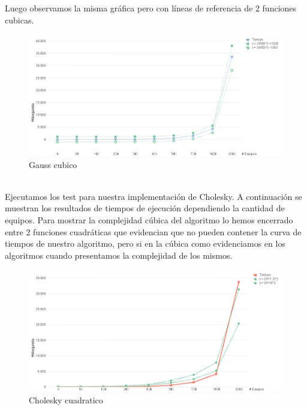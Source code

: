 Luego observamos la misma gráfica pero con líneas de referencia de 2 funciones cubicas. \\

\begin{figure}[H]
    \centering
    \includegraphics[width=1\textwidth]{IMG/gauss cubico.png}
    \caption{Gauss cubico}
    \label{fig:Gauss cubico}
\end{figure}

\\
Ejecutamos los test para nuestra implementación de Cholesky. A continuación se muestran los resultados de tiempos de ejecución dependiendo la cantidad de equipos.
Para mostrar la complejidad cúbica del algoritmo lo hemos encerrado entre 2 funciones cuadráticas que evidencian que no pueden contener la curva de tiempos de nuestro algoritmo, pero si en la cúbica como evidenciamos en los algoritmos cuando presentamos la complejidad de los mismos.\\

\begin{figure}[H]
    \centering
    \includegraphics[width=1\textwidth]{IMG/cholesky cuadratico.png}
    \caption{Cholesky cuadratico}
    \label{fig:Cholesky cuadratico}
\end{figure}

\\

